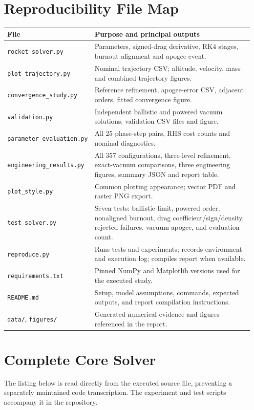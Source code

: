 \documentclass{article}
\begin{document}
\section{Reproducibility File Map}
\label{app:files}
\small
\begin{tabular}{>{\raggedright\arraybackslash}p{.31\linewidth}>{\raggedright\arraybackslash}p{.63\linewidth}}
\toprule
File & Purpose and principal outputs\\
\midrule
\texttt{rocket\_solver.py} & Parameters, signed-drag derivative, RK4 stages, burnout alignment and apogee event.\\
\texttt{plot\_trajectory.py} & Nominal trajectory CSV; altitude, velocity, mass and combined trajectory figures.\\
\texttt{convergence\_study.py} & Reference refinement, apogee-error CSV, adjacent orders, fitted convergence figure.\\
\texttt{validation.py} & Independent ballistic and powered vacuum solutions; validation CSV files and figure.\\
\texttt{parameter\_evaluation.py} & All 25 phase-step pairs, RHS cost counts and nominal diagnostics.\\
\texttt{engineering\_results.py} & All 357 configurations, three-level refinement, exact-vacuum comparisons, three engineering figures, summary JSON and report table.\\
\texttt{plot\_style.py} & Common plotting appearance; vector PDF and raster PNG export.\\
\texttt{test\_solver.py} & Seven tests: ballistic limit, powered order, nonaligned burnout, drag coefficient/sign/density, rejected failures, vacuum apogee, and evaluation count.\\
\texttt{reproduce.py} & Runs tests and experiments; records environment and execution log; compiles report when available.\\
\texttt{requirements.txt} & Pinned NumPy and Matplotlib versions used for the executed study.\\
\texttt{README.md} & Setup, model assumptions, commands, expected outputs, and report compilation instructions.\\
\texttt{data/}, \texttt{figures/} & Generated numerical evidence and figures referenced in the report.\\
\bottomrule
\end{tabular}
\normalsize


\clearpage
\section{Complete Core Solver}
\label{app:code}
The listing below is read directly from the executed source file, preventing a separately maintained code transcription. The experiment and test scripts accompany it in the repository. 
\end{document}

